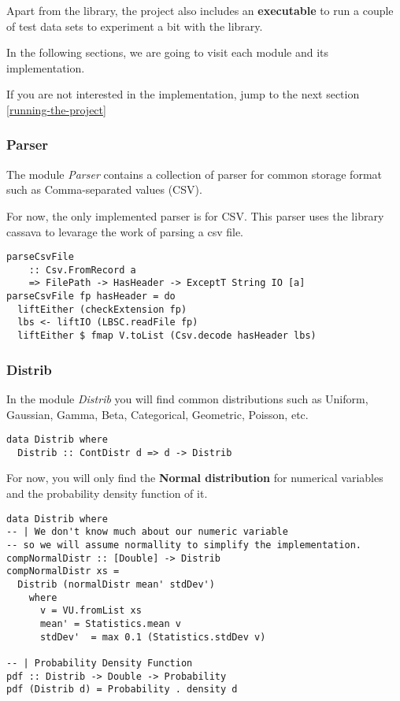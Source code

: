 \documentclass[12pt, a4paper]{article}
\begin{document}
Apart from the library, the project also includes an \textbf{executable} to run a couple of test data sets to experiment a bit with the library.

In the following sections, we are going to visit each module and its implementation.

If you are not interested in the implementation, jump to the next section \ref{running-the-project}

\subsubsection{Parser} \label{parser}

The module \textit{Parser} contains a collection of parser for common storage format such as Comma-separated values (CSV).

For now, the only implemented parser is for CSV. This parser uses the library cassava \cite{cassava} to levarage the work of parsing a csv file.

\begin{verbatim}
parseCsvFile
    :: Csv.FromRecord a
    => FilePath -> HasHeader -> ExceptT String IO [a]
parseCsvFile fp hasHeader = do
  liftEither (checkExtension fp)
  lbs <- liftIO (LBSC.readFile fp)
  liftEither $ fmap V.toList (Csv.decode hasHeader lbs)
\end{verbatim}

\subsubsection{Distrib} \label{distrib}

In the module \textit{Distrib} you will find common distributions such as Uniform, Gaussian, Gamma, Beta, Categorical, Geometric, Poisson, etc.

\begin{verbatim}
data Distrib where
  Distrib :: ContDistr d => d -> Distrib
\end{verbatim}

For now, you will only find the \textbf{Normal distribution} for numerical variables and the probability density function of it.

\begin{verbatim}
data Distrib where
-- | We don't know much about our numeric variable
-- so we will assume normallity to simplify the implementation.
compNormalDistr :: [Double] -> Distrib
compNormalDistr xs =
  Distrib (normalDistr mean' stdDev')
    where
      v = VU.fromList xs
      mean' = Statistics.mean v
      stdDev'  = max 0.1 (Statistics.stdDev v)

-- | Probability Density Function
pdf :: Distrib -> Double -> Probability
pdf (Distrib d) = Probability . density d
\end{verbatim}
\end{document}
